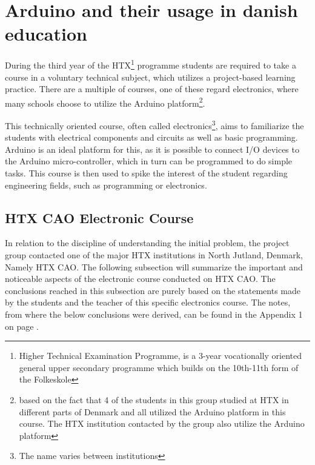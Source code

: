 
\section{Arduino and their usage in danish education}
During the third year of the HTX\footnote{Higher Technical Examination Programme, is a 3-year vocationally oriented general upper secondary programme which builds on the 10th-11th form of the Folkeskole\cite{htx_wiki}} programme students are required to take a course in a voluntary technical subject, which utilizes a project-based learning practice. 
There are a multiple of courses, one of these regard electronics, where many schools choose to utilize the Arduino platform\footnote{based on the fact that 4 of the students in this group studied at HTX in different parts of Denmark and all utilized the Arduino platform in this course. The HTX institution contacted by the group also utilize the Arduino platform}\cite{holstebro_education}.

This technically oriented course, often called electronics\footnote{The name varies between institutions}, aims to familiarize the students with electrical components and circuits as well as basic programming.\cite{holstebro_electronic}
Arduino is an ideal platform for this, as it is possible to connect I/O devices to the Arduino micro-controller, which in turn can be programmed to do simple tasks. 
This course is then used to spike the interest of the student regarding engineering fields, such as programming or electronics.


\subsection{HTX CAO Electronic Course}
In relation to the discipline of understanding the initial problem, the project group contacted one of the major HTX institutions in North Jutland, Denmark, Namely HTX CAO. 
The following subsection will summarize the important and noticeable aspects of the electronic course conducted on HTX CAO. 
The conclusions reached in this subsection are purely based on the statements made by the students and the teacher of this specific electronics course.
The notes, from where the below conclusions were derived, can be found in the Appendix 1 on page \pageref{Interviews}.

